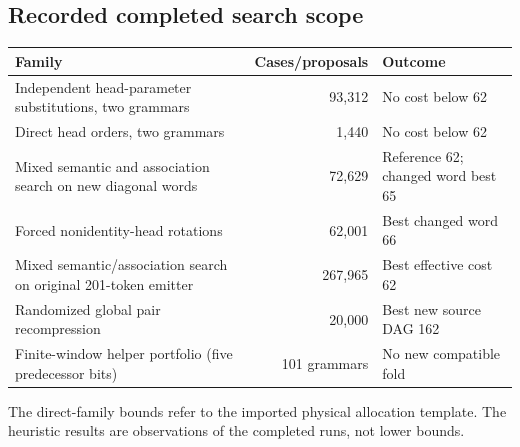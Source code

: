 \subsection{Recorded completed search scope}
\begin{center}\small
\begin{tabular}{@{}p{8.5cm}rp{3.1cm}@{}}
\toprule Family & Cases/proposals & Outcome\\\midrule
Independent head-parameter substitutions, two grammars & 93,312 & No cost below 62\\
Direct head orders, two grammars & 1,440 & No cost below 62\\
Mixed semantic and association search on new diagonal words & 72,629 & Reference 62; changed word best 65\\
Forced nonidentity-head rotations & 62,001 & Best changed word 66\\
Mixed semantic/association search on original 201-token emitter & 267,965 & Best effective cost 62\\
Randomized global pair recompression & 20,000 & Best new source DAG 162\\
Finite-window helper portfolio (five predecessor bits) & 101 grammars & No new compatible fold\\
\bottomrule
\end{tabular}\end{center}
The direct-family bounds refer to the imported physical allocation template.
The heuristic results are observations of the completed runs, not lower bounds.
